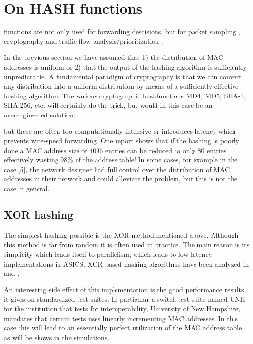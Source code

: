 \section{On HASH functions}
functions are not only used for forwarding descisions, but for packet sampling \cite{Molina}, cryptography 
\cite{Sklavos2003}\cite{Kang2002} and traffic  flow analysis/prioritization \cite{Intel2009}.

 In the previous section we have assumed that 1) the distribution of 
MAC addresses is uniform or 2) that the output of the hashing algorithm
is sufficiently unpredictable. A fundamental paradigm of cryptography is that we can convert any distribution 
into a uniform distribution by means of a sufficiently effective hashing algorithm.
The various cryptographic hashfunctions MD4, MD5, SHA-1, SHA-256, etc. will certainly do the trick,
but would in this case be an overengineered solution.


but these are often too computationally intensive or introduces latency which prevents wire-speed
forwarding.
One report \cite{Stancu2003} shows that if the hashing is poorly done a MAC address size of 4096
entries can be reduced to only 80 entries effectively wasting 98\% of the address table!
In some cases, for example in the case [5], the network designer had full control over the 
distribution of MAC addresses in their network and could alleviate the problem, but this is not 
the case in general.

\subsection{XOR hashing}
The simplest hashing possible is the XOR method mentioned above. Although this method 
is far from random it is often used in practice. The main reason is
its simplicity which lends itself to parallelism, which leads to low latency implementations in ASICS.
XOR based hashing algorithms have been analyzed in \cite{Vandiren2005} and \cite{Martinez2005}.

An interesting side effect of this implementation is the good performance results it gives on standardized
test suites. In particular a switch test suite named UNH
for the institution that tests for interoperability, University of New Hampshire, mandates 
that certain tests uses linearly incrementing MAC addresses. In this case this will lead 
to an essentially perfect utilization of the MAC address table, as will be shows in the simulations.

